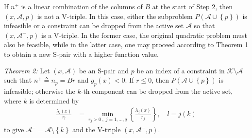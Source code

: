 \documentclass[a4paper,twoside,10pt,english]{report}
\begin{document}
If $n^{+}$ is a linear combination of the columns of $B$ at the
start of Step 2, then $\left(x,\mathcal{A},p\right)$ is not a V-triple.
In this case, either the subproblem $P\left(\mathcal{A}\cup\left\{ p\right\} \right)$
is infeasible or a constraint can be dropped from the active set $\mathcal{A}$
so that $\left(x,\mathcal{A}^{-},p\right)$ is a V-triple. In the
former case, the original quadratic problem must also be feasible, while in the
latter case, one may proceed according to Theorem 1 to obtain a new
S-pair with a higher function value.
\begin{framed}
\emph{Theorem 2:} Let $\left(x,\mathcal{A}\right)$ be an S-pair and
$p$ be an index of a constraint in $\mathcal{K}\setminus\mathcal{A}$
such that $n^{+}\triangleq n_{p}=Br$ and $g_{p}\left(x\right) < 0$.
If $r \le 0$, then $P\left(\mathcal{A}\cup\left\{ p\right\} \right)$
is infeasible; otherwise the $k$-th component can be dropped from
the active set, where $k$ is determined by 
\begin{align*}
\frac{\lambda_{l}\left(x\right)}{r_{l}} &= \min_{r_{j}>0\;,\; j=1,\ldots,q}\left\{ \frac{\lambda_{j}\left(x\right)}{r_{j}}\right\} ,\quad l=j\left(k\right)
\end{align*}
to give $\mathcal{A}^{-}=\mathcal{A}\setminus\left\{ k\right\} $
and the V-triple $\left(x,\mathcal{A}^{-},p\right)$. 


\end{framed}
\end{document}
